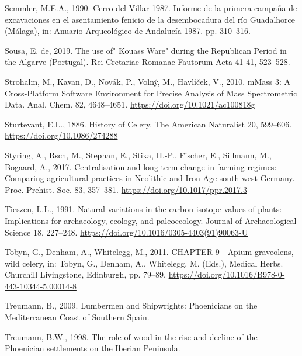 \documentclass[preprint, 3p, authoryear]{elsarticle} %
\newlength{\cslhangindent}
\newlength{\cslentryspacingunit} %
\newenvironment{CSLReferences}[2] %
 {%
  \setlength{\parindent}{0pt}
  \ifodd #1
  \let\oldpar\par
  \def\par{\hangindent=\cslhangindent\oldpar}
  \fi
  \setlength{\parskip}{#2\cslentryspacingunit}
 }%
 {}
\begin{document}
\begin{CSLReferences}{1}{0}
\leavevmode{}%
Semmler, M.E.A., 1990. Cerro del {Villar} 1987. {Informe} de la primera campaña de excavaciones en el asentamiento fenicio de la desembocadura del río {Guadalhorce} ({Málaga}), in: Anuario Arqueológico de {Andalucía} 1987. pp. 310--316.

\leavevmode{}%
Sousa, E. de, 2019. The use of" {Kouass Ware}" during the {Republican Period} in the {Algarve} ({Portugal}). Rei Cretariae Romanae Fautorum Acta 41 41, 523--528.

\leavevmode{}%
Strohalm, M., Kavan, D., Novák, P., Volný, M., Havlíček, V., 2010. {mMass} 3: A {Cross}-{Platform Software Environment} for {Precise Analysis} of {Mass Spectrometric Data}. Anal. Chem. 82, 4648--4651. \url{https://doi.org/10.1021/ac100818g}

\leavevmode{}%
Sturtevant, E.L., 1886. History of {Celery}. The American Naturalist 20, 599--606. \url{https://doi.org/10.1086/274288}

\leavevmode{}%
Styring, A., Rsch, M., Stephan, E., Stika, H.-P., Fischer, E., Sillmann, M., Bogaard, A., 2017. Centralisation and long-term change in farming regimes: Comparing agricultural practices in {Neolithic} and {Iron Age} south-west {Germany}. Proc. Prehist. Soc. 83, 357--381. \url{https://doi.org/10.1017/ppr.2017.3}

\leavevmode{}%
Tieszen, L.L., 1991. Natural variations in the carbon isotope values of plants: {Implications} for archaeology, ecology, and paleoecology. Journal of Archaeological Science 18, 227--248. \url{https://doi.org/10.1016/0305-4403(91)90063-U}

\leavevmode{}%
Tobyn, G., Denham, A., Whitelegg, M., 2011. {CHAPTER} 9 - {Apium} graveolens, wild celery, in: Tobyn, G., Denham, A., Whitelegg, M. (Eds.), Medical {Herbs}. {Churchill Livingstone}, {Edinburgh}, pp. 79--89. \url{https://doi.org/10.1016/B978-0-443-10344-5.00014-8}

\leavevmode{}%
Treumann, B., 2009. Lumbermen and {Shipwrights}: {Phoenicians} on the {Mediterranean Coast} of {Southern Spain}.

\leavevmode{}%
Treumann, B.W., 1998. The role of wood in the rise and decline of the {Phoenician} settlements on the {Iberian Peninsula}.


\end{CSLReferences}
\end{document}
